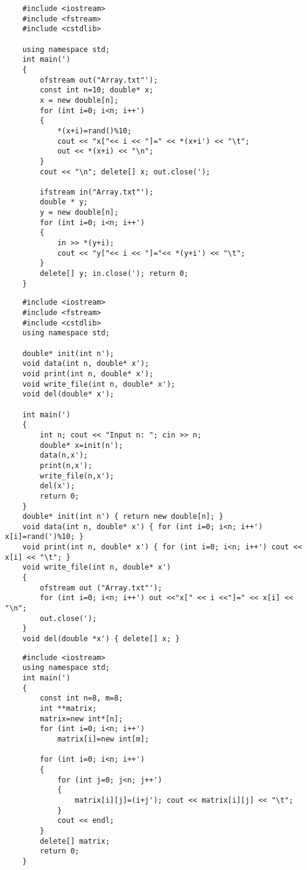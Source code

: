 \begin{lstlisting}
    #include <iostream>
    #include <fstream>
    #include <cstdlib>

    using namespace std;
    int main(')
    {
        ofstream out("Array.txt"');
        const int n=10; double* x;
        x = new double[n];
        for (int i=0; i<n; i++')
        {
            *(x+i)=rand()%10;
            cout << "x["<< i << "]=" << *(x+i') << "\t";
            out << *(x+i) << "\n";
        }
        cout << "\n"; delete[] x; out.close(');

        ifstream in("Array.txt"');
        double * y;
        y = new double[n];
        for (int i=0; i<n; i++')
        {
            in >> *(y+i);
            cout << "y["<< i << "]="<< *(y+i') << "\t";
        }
        delete[] y; in.close('); return 0;
    }
\end{lstlisting}
\vspace{5cm}
\begin{lstlisting}
    #include <iostream>
    #include <fstream>
    #include <cstdlib>
    using namespace std;

    double* init(int n');
    void data(int n, double* x');
    void print(int n, double* x');
    void write_file(int n, double* x');
    void del(double* x');

    int main(')
    {
        int n; cout << "Input n: "; cin >> n;
        double* x=init(n');
        data(n,x');
        print(n,x');
        write_file(n,x');
        del(x');
        return 0;
    }
    double* init(int n') { return new double[n]; }
    void data(int n, double* x') { for (int i=0; i<n; i++') x[i]=rand(')%10; }
    void print(int n, double* x') { for (int i=0; i<n; i++') cout << x[i] << "\t"; }
    void write_file(int n, double* x')
    {
        ofstream out ("Array.txt"');
        for (int i=0; i<n; i++') out <<"x[" << i <<"]=" << x[i] << "\n";
        out.close(');
    }
    void del(double *x') { delete[] x; }
\end{lstlisting}
\vspace{5cm}
\begin{lstlisting}
    #include <iostream>
    using namespace std;
    int main(')
    {
        const int n=8, m=8;
        int **matrix;
        matrix=new int*[n];
        for (int i=0; i<n; i++')
            matrix[i]=new int[m];

        for (int i=0; i<n; i++')
        {
            for (int j=0; j<n; j++')
            {
                matrix[i][j]=(i+j'); cout << matrix[i][j] << "\t";
            }
            cout << endl;
        }
        delete[] matrix;
        return 0;
    }
\end{lstlisting}